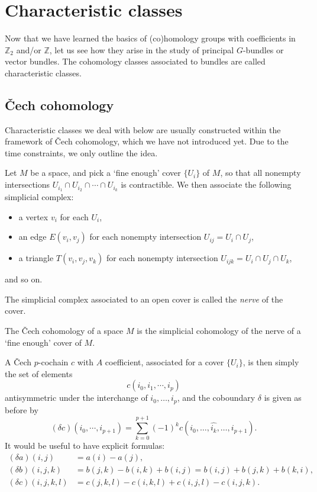 \documentclass[12pt]{article}
\numberwithin{equation}{section}
\numberwithin{figure}{section}
\theoremstyle{remark}
\def\bZ{\mathbb{Z}}
\begin{document}
\section{Characteristic classes}

Now that we have learned the basics of (co)homology groups with coefficients in $\bZ_2$ and/or $\bZ$,
let us see how they arise in the study of principal $G$-bundles or vector bundles.
The cohomology classes associated to bundles are called characteristic classes.

\subsection{\v Cech cohomology}

Characteristic classes we deal with below are usually constructed within the framework of \v Cech cohomology, 
which we have not introduced yet.
Due to the time constraints, we only outline the idea. 

Let $M$ be a space, and pick a `fine enough' cover $\{U_i\}$ of $M$,
so that all nonempty intersections $U_{i_1} \cap U_{i_2} \cap \cdots \cap U_{i_k}$ is contractible.
We then associate the following simplicial complex:
\begin{itemize}
\item    a vertex $v_i$ for each $U_i$,
\item an edge $E(v_i,v_j)$ for each nonempty intersection $U_{ij}=U_i\cap U_j$,
\item a triangle $T(v_i,v_j,v_k)$ for each nonempty intersection $U_{ijk}=U_i \cap U_j \cap U_k$,
\end{itemize}
and so on. 
\begin{definition}
The simplicial complex associated to an open cover is called the \emph{nerve} of the cover.
\end{definition}

\begin{definition}
The \v Cech cohomology of a space $M$ is the simplicial cohomology 
of the nerve of a `fine enough' cover of $M$.
\end{definition}

A \v Cech $p$-cochain $c$ with $A$ coefficient, associated for a cover $\{U_i\}$,
 is then  simply the set of elements \begin{equation}
 c(i_0,i_1,\cdots, i_p)
\end{equation}
antisymmetric under the interchange of $i_0,\ldots,i_p$,
and the coboundary $\delta$ is given as before by \begin{equation}
(\delta c)(i_0,\cdots, i_{p+1})=\sum_{k=0}^{p+1}(-1)^k c(i_0,\ldots,\widehat{ i_k},\ldots, i_{p+1}).
\end{equation}
It would be useful to have explicit formulas: \begin{align}
(\delta a)(i,j) &= a(i) - a(j),\\
(\delta b)(i,j,k) &= b(j,k) -b(i,k) + b(i,j) = b(i,j) + b(j,k)+ b(k,i),\\
(\delta c)(i,j,k,l) &= c(j,k,l) - c(i,k,l) + c(i,j,l) - c(i,j,k).
\end{align}
\end{document}
